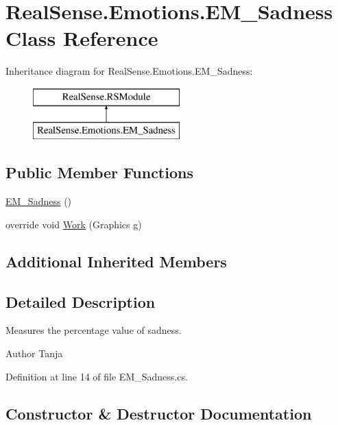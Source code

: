 \hypertarget{class_real_sense_1_1_emotions_1_1_e_m___sadness}{}\section{Real\+Sense.\+Emotions.\+E\+M\+\_\+\+Sadness Class Reference}
\label{class_real_sense_1_1_emotions_1_1_e_m___sadness}
Inheritance diagram for Real\+Sense.\+Emotions.\+E\+M\+\_\+\+Sadness\+:\begin{figure}[H]
\begin{center}
\leavevmode
\includegraphics[height=2.000000cm]{class_real_sense_1_1_emotions_1_1_e_m___sadness}
\end{center}
\end{figure}
\subsection*{Public Member Functions}
\begin{DoxyCompactItemize}
\item 
\hyperlink{class_real_sense_1_1_emotions_1_1_e_m___sadness_ad0a149a2f1b6aefd5fedd870a1cefb00}{E\+M\+\_\+\+Sadness} ()
\item 
override void \hyperlink{class_real_sense_1_1_emotions_1_1_e_m___sadness_a45cf23f5c3382bc9769abf1ef401ade1}{Work} (Graphics g)
\end{DoxyCompactItemize}
\subsection*{Additional Inherited Members}


\subsection{Detailed Description}
Measures the percentage value of sadness. \begin{DoxyAuthor}{Author}
Tanja 
\end{DoxyAuthor}


Definition at line 14 of file E\+M\+\_\+\+Sadness.\+cs.



\subsection{Constructor \& Destructor Documentation}
\mbox{\label{class_real_sense_1_1_emotions_1_1_e_m___sadness_ad0a149a2f1b6aefd5fedd870a1cefb00}} 
